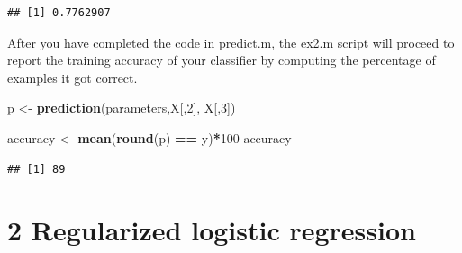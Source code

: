 \documentclass[
]{book}
\newenvironment{Shaded}{\begin{snugshade}}{\end{snugshade}}
\newcommand{\CommentTok}[1]{\textcolor[rgb]{0.56,0.35,0.01}{\textit{#1}}}
\newcommand{\ControlFlowTok}[1]{\textcolor[rgb]{0.13,0.29,0.53}{\textbf{#1}}}
\newcommand{\DataTypeTok}[1]{\textcolor[rgb]{0.13,0.29,0.53}{#1}}
\newcommand{\DecValTok}[1]{\textcolor[rgb]{0.00,0.00,0.81}{#1}}
\newcommand{\KeywordTok}[1]{\textcolor[rgb]{0.13,0.29,0.53}{\textbf{#1}}}
\newcommand{\NormalTok}[1]{#1}
\newcommand{\OperatorTok}[1]{\textcolor[rgb]{0.81,0.36,0.00}{\textbf{#1}}}
\newcommand{\StringTok}[1]{\textcolor[rgb]{0.31,0.60,0.02}{#1}}
\begin{document}
\begin{Shaded}
\end{Shaded}

\begin{verbatim}
## [1] 0.7762907
\end{verbatim}

After you have completed the code in predict.m, the ex2.m script will proceed to report the training accuracy of your classifier by computing the percentage of examples it got correct.

\begin{Shaded}
\begin{Highlighting}[]
\NormalTok{p <-}\StringTok{ }\KeywordTok{prediction}\NormalTok{(parameters,X[,}\DecValTok{2}\NormalTok{], X[,}\DecValTok{3}\NormalTok{])}

\NormalTok{accuracy <-}\StringTok{ }\KeywordTok{mean}\NormalTok{(}\KeywordTok{round}\NormalTok{(p) }\OperatorTok{==}\StringTok{ }\NormalTok{y)}\OperatorTok{*}\DecValTok{100}
\NormalTok{accuracy}
\end{Highlighting}
\end{Shaded}

\begin{verbatim}
## [1] 89
\end{verbatim}

\hypertarget{regularized-logistic-regression}{%
\chapter{2 Regularized logistic regression}\label{regularized-logistic-regression}}
\end{document}
